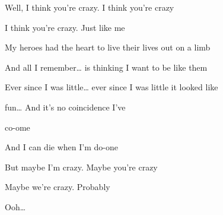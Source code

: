 \begin{song}
\bigskip

Well, I think you're crazy. I think you're crazy \par
I think you're crazy. Just like me  \par

\bigskip

 My heroes had the heart to live their lives out on a limb  \par
And all I remember… is thinking I want to be like them  \par

\bigskip

 Ever since I was little… ever since I was little it looked like \par
{}fun… And it's no coincidence I've \par
co-ome  \par
And I can die when I'm do-one  \par

\bigskip

But maybe I'm crazy. Maybe you're crazy \par
Maybe we're crazy. Probably  \par

\bigskip

 Ooh…     \par
{} \par

\end{song}
